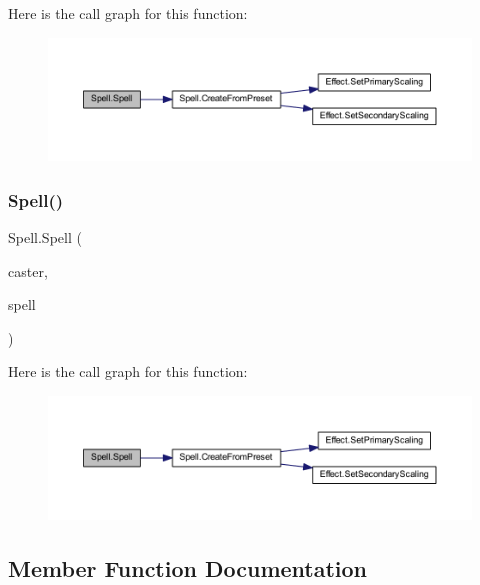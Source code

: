 Here is the call graph for this function\+:\nopagebreak
\begin{figure}[H]
\begin{center}
\leavevmode
\includegraphics[width=350pt]{class_spell_a34acc5591bc0b3c8a1d9468e952be3c4_cgraph}
\end{center}
\end{figure}
\mbox{\label{class_spell_a555a02d92d6de53a3b6d39bfda11c2cc}} 
\subsubsection{\texorpdfstring{Spell()}{Spell()}\hspace{0.1cm}{\footnotesize\ttfamily [2/2]}}
{\footnotesize\ttfamily Spell.\+Spell (\begin{DoxyParamCaption}\item[{\mbox{\hyperlink{class_base_unit}{Base\+Unit}}}]{caster,  }\item[{\mbox{\hyperlink{class_spell_a5520e850e7000a6156b3456672b72ed1}{Preset}}}]{spell }\end{DoxyParamCaption})}

Here is the call graph for this function\+:\nopagebreak
\begin{figure}[H]
\begin{center}
\leavevmode
\includegraphics[width=350pt]{class_spell_a555a02d92d6de53a3b6d39bfda11c2cc_cgraph}
\end{center}
\end{figure}


\subsection{Member Function Documentation}
\mbox{\label{class_spell_aa020942716a6504fc6b23351a4baa3b6}} 
